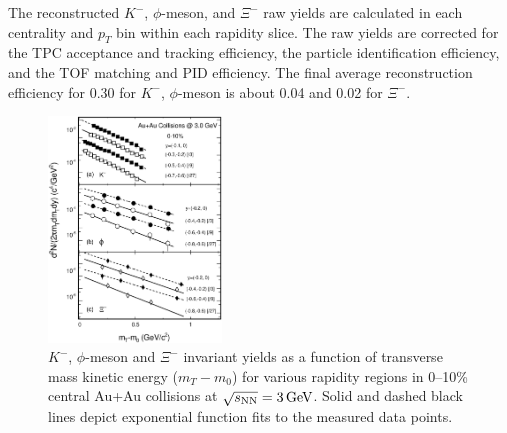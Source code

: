 \documentclass[%
 reprint,	
showpacs,
 amsmath,amssymb,
 aps,
 prc,
]{revtex4-1}
\begin{document}
The reconstructed $K^-$, $\phi$-meson, and $\Xi^-$ raw yields are calculated in each centrality and $p_{T}$ bin within each rapidity slice. 
The raw yields are corrected for the TPC acceptance and tracking efficiency, %
the particle identification efficiency, %
and the TOF matching and PID efficiency. The final average reconstruction efficiency for 0.30 for $K^-$, $\phi$-meson is about 0.04 and 0.02 for $\Xi^-$.

\begin{figure}
\centering
\includegraphics[width=0.41\textwidth]{fig/fig2_h_mT_spectra_phiMeson.eps}
  \caption{ $K^-$, $\phi$-meson and $\Xi^-$ invariant yields as a function of transverse mass kinetic energy ($m_T-m_0$) for various rapidity regions in 0--10\% central Au+Au collisions at ${\sqrt{s_{\rm NN}} = \rm{3\,GeV}}$. Solid and dashed black lines depict exponential function fits to the measured data points.}
\label{fig:phimTSpectra} 
\end{figure}
\end{document}

